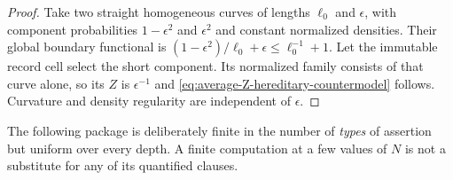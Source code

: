 \documentclass[11pt]{article}
\begin{document}
\begin{proof}
Take two straight homogeneous curves of lengths $\ell_0$ and $\epsilon$, with
component probabilities $1-\epsilon^2$ and $\epsilon^2$ and constant
normalized densities.  Their global boundary functional is
$(1-\epsilon^2)/\ell_0+\epsilon\le\ell_0^{-1}+1$.  Let the immutable record
cell select the
short component.  Its normalized family consists of that curve alone, so
its $Z$ is $\epsilon^{-1}$ and
\eqref{eq:average-Z-hereditary-countermodel} follows.  Curvature and density
regularity are independent of $\epsilon$.
\end{proof}

The following package is deliberately finite in the number of \emph{types}
of assertion but uniform over every depth.  A finite computation at a few
values of $N$ is not a substitute for any of its quantified clauses.
\end{document}
